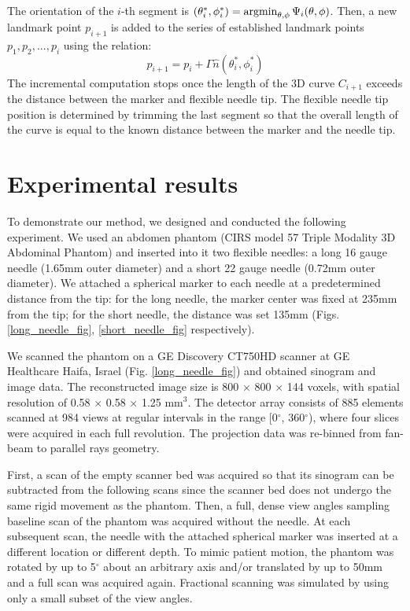 The orientation of the $i$-th segment is $(\theta_i^*, \phi_i^*) = \operatorname*{argmin}_{\theta, \phi} {\Psi_i ( \theta, \phi)}$. Then, a new landmark point $p_{i+1}$ is added to the series of established landmark points $p_1, p_2, ..., p_i$ using the relation:
\begin{equation}
p_{i+1} = p_i + \Gamma \hat{n}(\theta_i^*, \phi_i^*)
\end{equation}
The incremental computation stops once the length of the 3D curve $C_{i+1}$ exceeds the distance between the marker and flexible needle tip. The flexible needle tip position is determined by trimming the last segment so that the overall length of the curve is equal to the known distance between the marker and the needle tip.

\section*{Experimental results}

To demonstrate our method, we designed and conducted the following experiment. We used an abdomen phantom (CIRS model 57 Triple Modality 3D Abdominal Phantom) and inserted into it two flexible needles: a long 16 gauge needle (1.65mm outer diameter) and a short 22 gauge needle (0.72mm outer diameter). We attached a spherical marker to each needle at a predetermined distance from the tip: for the long needle, the marker center was fixed at 235mm from the tip; for the short needle, the distance was set 135mm (Figs.  \ref{long_needle_fig}, \ref{short_needle_fig} respectively).

We scanned the phantom on a GE Discovery CT750HD scanner at GE Healthcare Haifa, Israel (Fig. \ref{long_needle_fig}) and obtained sinogram and image data. The reconstructed image size is 800 $\times$ 800 $\times$ 144 voxels, with spatial resolution of 0.58 $\times$ 0.58 $\times$ 1.25 mm$^3$. The detector array consists of 885 elements scanned at 984 views at regular intervals in the range [0$^{\circ}$, 360$^{\circ}$), where four slices were acquired in each full revolution. The projection data was re-binned from fan-beam to parallel rays geometry.

First, a scan of the empty scanner bed was acquired so that its sinogram can be subtracted from the following scans since the scanner bed does not undergo the same rigid movement as the phantom. Then, a full, dense view angles sampling baseline scan of the phantom was acquired without the needle. At each subsequent scan, the needle with the attached spherical marker was inserted at a different location or different depth. To mimic patient motion, the phantom was rotated by up to 5$^\circ$ about an arbitrary axis and/or translated by up to 50mm  and a full scan was acquired again. Fractional scanning was simulated by using only a small subset of the view angles.


